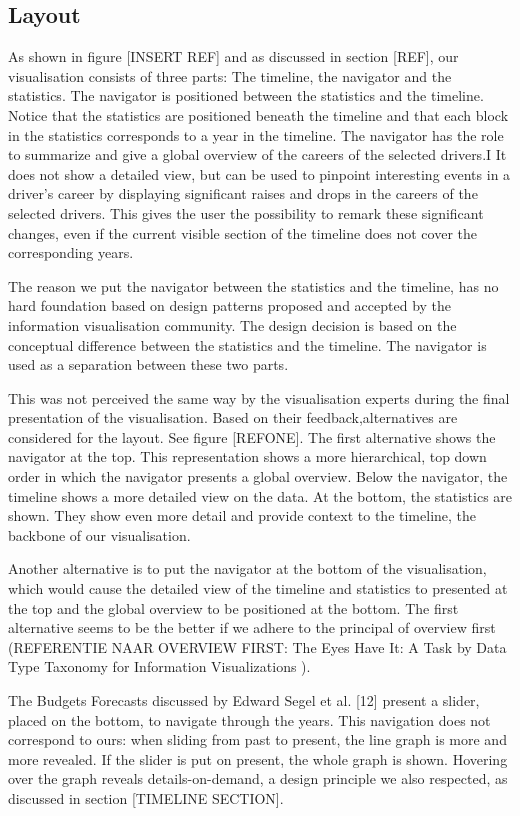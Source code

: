 \documentclass{sigchi}
\begin{document}
\subsection{Layout} %
\label{sub:layout}
As shown in figure [INSERT REF] and as discussed in section [REF], our visualisation consists of three parts: The timeline, the navigator and the statistics. The navigator is positioned between the statistics and the timeline. Notice that the statistics are positioned beneath the timeline and that each block in the statistics corresponds to a year in the timeline. 
The navigator has the role to summarize and give a global  overview of the careers of the selected drivers.I It does not show a detailed view, but can be used to pinpoint interesting events in a driver’s career by displaying  significant raises and drops in the careers of the selected drivers. This gives the user the possibility to remark these significant changes, even if the current visible section of the timeline does not cover the corresponding years.

The reason we put the navigator between the statistics and the timeline, has no hard foundation based on design patterns proposed and accepted by the information visualisation community. The design decision is based on the conceptual difference between  the statistics and the timeline. The navigator is used as a separation between these two parts.

This was not perceived the same way by the visualisation experts during the final presentation of the visualisation. Based on their feedback,alternatives are considered for the layout. See figure [REFONE]. The first alternative shows the navigator at the top. This representation shows a more hierarchical, top down order in which the navigator presents a global overview. Below the navigator, the timeline shows a more detailed view on the data. At the bottom, the statistics are shown. They show even more detail and provide context to the timeline, the backbone of our visualisation. 

Another alternative is to put the navigator at the bottom of the visualisation, which would cause the detailed view of the timeline and statistics to presented at the top and the global overview to be positioned at the bottom. The first alternative seems to be the better if we adhere to the principal of overview first (REFERENTIE NAAR OVERVIEW FIRST: The Eyes Have It: A Task by Data Type Taxonomy for Information Visualizations ).

The Budgets Forecasts discussed by Edward Segel et al. [12] present a slider, placed on the bottom, to navigate through the years.  This navigation does not correspond to ours: when sliding from past to present, the line graph is more and more revealed. If the slider is put on present, the whole graph is shown. Hovering over the graph reveals details-on-demand, a design principle we also respected, as discussed in section [TIMELINE SECTION].
\end{document}
